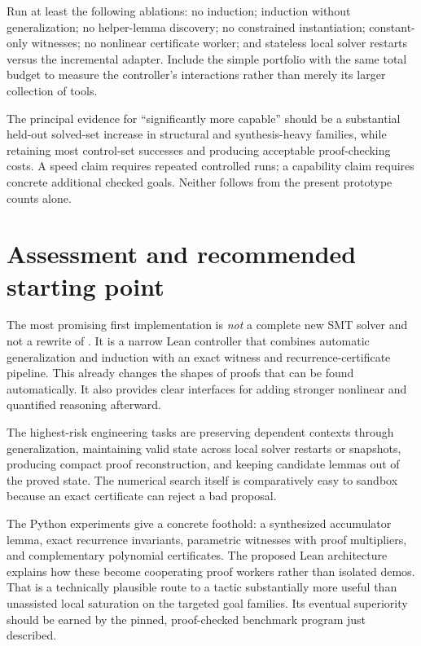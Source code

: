 Run at least the following ablations: no induction; induction without
generalization; no helper-lemma discovery; no constrained instantiation;
constant-only witnesses; no nonlinear certificate worker; and stateless local
solver restarts versus the incremental adapter. Include the simple portfolio
with the same total budget to measure the controller's interactions rather
than merely its larger collection of tools.

The principal evidence for ``significantly more capable'' should be a
substantial held-out solved-set increase in structural and synthesis-heavy
families, while retaining most control-set successes and producing acceptable
proof-checking costs. A speed claim requires repeated controlled runs; a
capability claim requires concrete additional checked goals. Neither follows
from the present prototype counts alone.

\section{Assessment and recommended starting point}

The most promising first implementation is \emph{not} a complete new SMT
solver and not a rewrite of \Grind{}. It is a narrow Lean controller that
combines automatic generalization and induction with an exact witness and
recurrence-certificate pipeline. This already changes the shapes of proofs
that can be found automatically. It also provides clear interfaces for adding
stronger nonlinear and quantified reasoning afterward.

The highest-risk engineering tasks are preserving dependent contexts through
generalization, maintaining valid state across local solver restarts or
snapshots, producing compact proof reconstruction, and keeping candidate
lemmas out of the proved state. The numerical search itself is comparatively
easy to sandbox because an exact certificate can reject a bad proposal.

The Python experiments give a concrete foothold: a synthesized accumulator
lemma, exact recurrence invariants, parametric witnesses with proof
multipliers, and complementary polynomial certificates. The proposed Lean
architecture explains how these become cooperating proof workers rather
than isolated demos. That is a technically plausible route to a tactic
substantially more useful than unassisted local saturation on the targeted
goal families. Its eventual superiority should be earned by the pinned,
proof-checked benchmark program just described.

